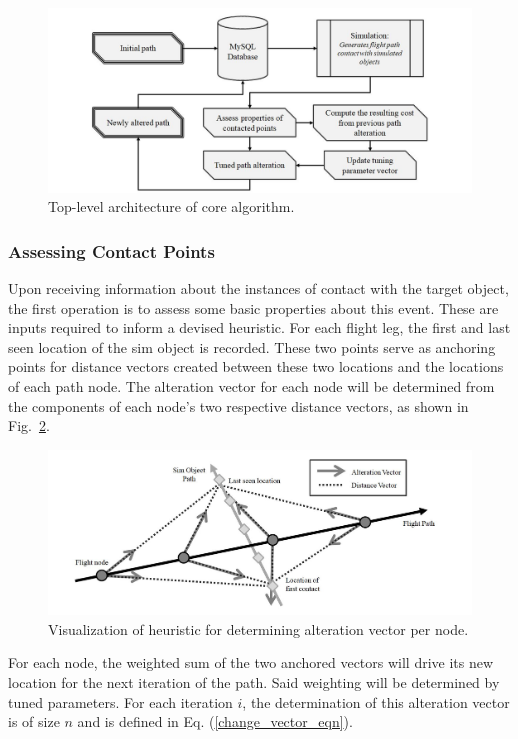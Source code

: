 \documentclass[conf]{new-aiaa}
\begin{document}
\begin{figure}[hbt!]
\centering
\includegraphics[width=1\textwidth]{figs/algo-architecture}
\caption{Top-level architecture of core algorithm.}
\label{algo-architecture}
\end{figure}

\subsubsection{Assessing Contact Points}
Upon receiving information about the instances of contact with the target object, the first operation is to assess some basic properties about this event. These are inputs required to inform a devised heuristic. For each flight leg, the first and last seen location of the sim object is recorded. These two points serve as anchoring points for distance vectors created between these two locations and the locations of each path node. The alteration vector for each node will be determined from the components of each node's two respective distance vectors, as shown in Fig.~\ref{heuristic-diagram}.

\begin{figure}[hbt!]
\centering
\includegraphics[width=1\textwidth]{figs/heuristic-diagram}
\caption{Visualization of heuristic for determining alteration vector per node.}
\label{heuristic-diagram}
\end{figure}

For each node, the weighted sum of the two anchored vectors will drive its new location for the next iteration of the path. Said weighting will be determined by tuned parameters. For each iteration $i$, the determination of this alteration vector is of size $n$ and is defined in Eq. (\ref{change_vector_eqn}).
\end{document}
